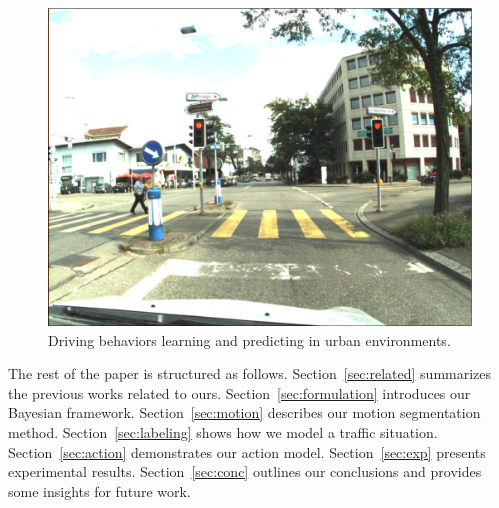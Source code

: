 \begin{figure}[t]
\centering
\includegraphics[width=0.65\columnwidth]{fig/place64.eps}
\caption{Driving behaviors learning and predicting in urban environments.}
\label{fig:final}
\end{figure}

The rest of the paper is structured as follows. Section~\ref{sec:related}
summarizes the previous works related to ours. Section~\ref{sec:formulation}
introduces our Bayesian framework. Section~\ref{sec:motion} describes our motion
segmentation method. Section~\ref{sec:labeling} shows how we model a traffic
situation. Section~\ref{sec:action} demonstrates our action model.
Section~\ref{sec:exp} presents experimental results. Section~\ref{sec:conc}
outlines our conclusions and provides some insights for future work.
